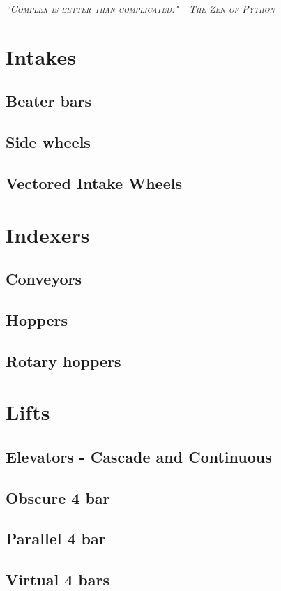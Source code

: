 \documentclass[10pt,letterpaper]{book}
\begin{document}
 {\slshape \scshape ``Complex is better than complicated." - The Zen of Python}
 \\

\section{Intakes}
\subsection{Beater bars}
\subsection{Side wheels}
\subsection{Vectored Intake Wheels}

\section{Indexers}
\subsection{Conveyors}
\subsection{Hoppers}
\subsection{Rotary hoppers}

\section{Lifts}
\subsection{Elevators - Cascade and Continuous}
\subsection{Obscure 4 bar}
\subsection{Parallel 4 bar}
\subsection{Virtual 4 bars}
\end{document}
